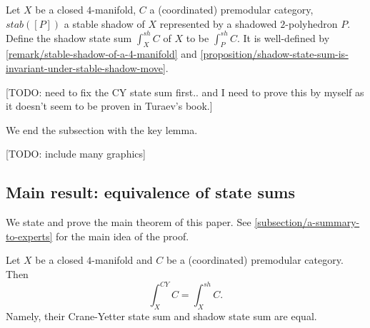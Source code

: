 
\begin{definition}\label{def/shadow-state-sum-of-a-4-manifold}
  Let $X$ be a closed $4$-manifold, $C$ a (coordinated)
  premodular category, $stab([P])$ a stable shadow of $X$
  represented by a shadowed $2$-polyhedron $P$. Define the shadow
  state sum $\int_{X}^{sh} C$ of $X$ to be $\int_{P}^{sh} C$. It
  is well-defined by \ref{remark/stable-shadow-of-a-4-manifold}
  and
  \ref{proposition/shadow-state-sum-is-invariant-under-stable-shadow-move}.
\end{definition}

\begin{proposition}\label{prop/shadow-state-sum-is-local}
  [TODO: need to fix the CY state sum first.. and I need to prove
  this by myself as it doesn't seem to be proven in Turaev's
  book.]
\end{proposition}

\noindent We end the subsection with the key lemma.

\begin{lemma}\label{lemma/10j-symbol-as-shadow-state-sum}
  [TODO: include many graphics]
\end{lemma}

\subsection{Main result: equivalence of state sums}

\noindent We state and prove the main theorem of this paper. See
\ref{subsection/a-summary-to-experts} for the main idea of the
proof.

\begin{theorem}
  Let $X$ be a closed $4$-manifold and $C$ be a (coordinated)
  premodular category. Then
  $$\int^{CY}_{X}C = \int^{sh}_{X} C.$$
  Namely, their Crane-Yetter state sum and shadow state sum are
  equal.
\end{theorem}

